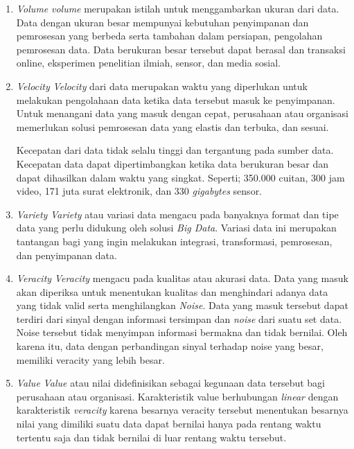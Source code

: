 \begin{enumerate}
	\item{\textit{Volume} \newline
	\textit{volume} merupakan istilah untuk menggambarkan ukuran dari data. Data dengan ukuran 		besar mempunyai kebutuhan penyimpanan dan pemrosesan yang berbeda serta tambahan dalam 			persiapan, pengolahan pemrosesan data. Data berukuran besar tersebut dapat berasal dan 			transaksi online, eksperimen penelitian ilmiah, sensor, dan media sosial.
	}
	
	\item{\textit{Velocity} \newline
	\textit{Velocity} dari data merupakan waktu yang diperlukan untuk melakukan pengolahaan 		data ketika data tersebut masuk ke penyimpanan. Untuk menangani data yang masuk dengan 			cepat, perusahaan atau organisasi memerlukan solusi pemrosesan data yang elastis dan 			terbuka, dan sesuai.
	
	Kecepatan dari data tidak selalu tinggi dan tergantung pada sumber data. Kecepatan data 		dapat dipertimbangkan ketika data berukuran besar dan dapat dihasilkan dalam waktu yang 		singkat. Seperti; 350.000 cuitan, 300 jam video, 171 juta surat elektronik, dan 330 			\textit{gigabytes} sensor.
	
	}
	
	\item{\textit{Variety} \newline
	\textit{Variety} atau variasi data mengacu pada banyaknya format dan tipe data yang perlu 		didukung oleh solusi \textit{Big Data}. Variasi data ini merupakan tantangan bagi yang 			ingin melakukan integrasi, transformasi, pemrosesan, dan penyimpanan data.
	}
	
	\item{\textit{Veracity} \newline
	\textit{Veracity} mengacu pada kualitas atau akurasi data. Data yang masuk akan diperiksa 		untuk menentukan kualitas dan menghindari adanya data yang tidak valid serta menghilangkan 		\textit{Noise}. Data yang masuk tersebut dapat terdiri dari sinyal dengan informasi 			tersimpan dan \textit{noise} dari suatu set data. Noise tersebut tidak menyimpan informasi 		bermakna dan tidak bernilai. Oleh karena itu, data dengan perbandingan sinyal terhadap 			noise yang besar, memiliki veracity yang lebih besar. 	
	}
	
	\item{\textit{Value} \newline
	\textit{Value} atau nilai didefinisikan sebagai kegunaan data tersebut bagi perusahaan atau 	organisasi. Karakteristik value berhubungan \textit{linear} dengan karakteristik 				\textit{veracity} karena besarnya veracity tersebut menentukan besarnya nilai yang dimiliki 	suatu data dapat bernilai hanya pada rentang waktu tertentu saja dan tidak bernilai di luar 	rentang waktu tersebut.
	}
\end{enumerate}

